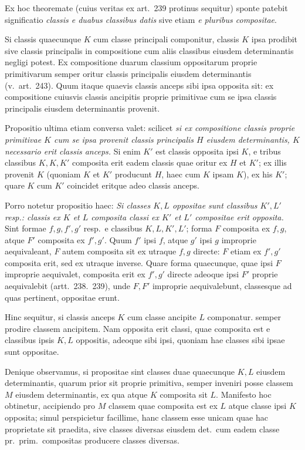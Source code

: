 Ex hoc theoremate (cuius veritas ex art.~239 protinus sequitur) sponte patebit significatio \textit{classis e duabus classibus datis} sive etiam \textit{e pluribus compositae}.

Si classis quaecunque $K$ cum classe principali componitur, classis $K$ ipsa prodibit sive classis principalis in compositione cum aliis classibus eiusdem determinantis negligi potest. Ex compositione duarum classium oppositarum proprie primitivarum semper oritur classis principalis eiusdem determinantis (v.\ art.~243). Quum itaque quaevis classis anceps sibi ipsa opposita sit: ex compositione cuiusvis classis ancipitis proprie primitivae cum se ipsa classis principalis eiusdem determinantis provenit.

Propositio ultima etiam conversa valet: scilicet \textit{si ex compositione classis proprie primitivae $K$ cum se ipsa provenit classis principalis $H$ eiusdem determinantis, $K$ necessario erit classis anceps.} Si enim $K'$ est classis opposita ipsi $K$, e tribus classibus $K,K,K'$ composita erit eadem classis quae oritur ex $H$ et $K'$; ex illis provenit $K$ (quoniam $K$ et $K'$ producunt $H$, haec cum $K$ ipsam $K$), ex his $K'$; quare $K$ cum $K'$ coincidet eritque adeo classis anceps.

Porro notetur propositio haec: \textit{Si classes $K,L$ oppositae sunt classibus $K',L'$ resp.: classis ex $K$ et $L$ composita classi ex $K'$ et $L'$ compositae erit opposita.} Sint formae $f,g,f',g'$ resp.\ e classibus $K,L,K',L'$; forma $F$ composita ex $f,g$, atque $F'$ composita ex $f',g'$. Quum $f'$ ipsi $f$, atque $g'$ ipsi $g$ improprie aequivaleant, $F$ autem composita sit ex utraque $f,g$ directe: $F$ etiam ex $f',g'$ composita erit, sed ex utraque inverse. Quare forma quaecunque, quae ipsi $F$ improprie aequivalet, composita erit ex $f',g'$ directe adeoque ipsi $F'$ proprie aequivalebit (artt.~238.~239), unde $F,F'$ improprie aequivalebunt, classesque ad quas pertinent, oppositae erunt.

Hinc sequitur, si classis anceps $K$ cum classe ancipite $L$ componatur. semper prodire classem ancipitem. Nam opposita erit classi, quae composita est e classibus ipsis $K,L$ oppositis, adeoque sibi ipsi, quoniam hae classes sibi ipsae sunt oppositae.

Denique observamus, si propositae sint classes duae quaecunque $K,L$ eiusdem determinantis, quarum prior sit proprie primitiva, semper inveniri posse classem $M$ eiusdem determinantis, ex qua atque $K$ composita sit $L$. Manifesto hoc obtinetur, accipiendo pro $M$ classem quae composita est ex $L$ atque classe ipsi $K$ opposita; simul perspicietur facillime, hanc classem esse unicam quae hac proprietate sit praedita, sive classes diversas eiusdem det.\ cum eadem classe pr.\ prim.\ compositas producere classes diversas.

